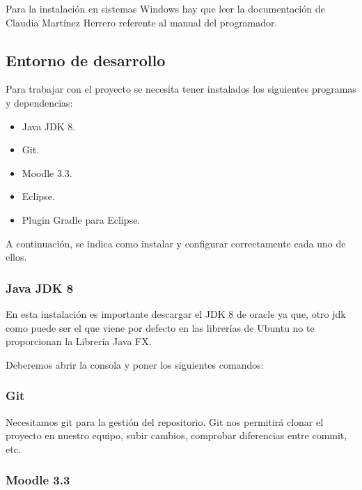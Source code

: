 Para la instalación en sistemas Windows hay que leer la documentación de Claudia Martínez Herrero \cite{claudia:anexo} referente al manual del programador.

\subsection{Entorno de desarrollo}\label{entorno-de-desarrollo}

Para trabajar con el proyecto se necesita tener instalados los
siguientes programas y dependencias:

\begin{itemize}
	\tightlist
	\item
	Java JDK 8.
	\item
	Git.
	\item
	Moodle 3.3.
	\item
	Eclipse.
	\item
	Plugin Gradle para Eclipse.
\end{itemize}

A continuación, se indica como instalar y configurar correctamente cada
uno de ellos.

\subsubsection{Java JDK 8}\label{java-jdk-8}

En esta instalación es importante descargar el JDK 8 de oracle ya que, otro jdk como puede ser el que viene por defecto en las librerías de Ubuntu no te proporcionan la Librería Java FX.

Deberemos abrir la consola y poner los siguientes comandos:


\subsubsection{Git}\label{git}

Necesitamos git para la gestión del repositorio. Git nos permitirá clonar el proyecto en nuestro equipo, subir cambios, comprobar diferencias entre commit, etc.


\subsubsection{Moodle 3.3}\label{moodle}

